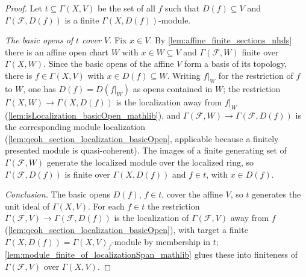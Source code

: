\begin{proof}\leanok
  Let \(t \subseteq \Gamma(X, V)\) be the set of all \(f\) such that
  \(D(f) \subseteq V\) and \(\Gamma(\mathcal{F}, D(f))\) is a finite
  \(\Gamma(X, D(f))\)-module.

  \emph{The basic opens of \(t\) cover \(V\).}  Fix \(x \in V\).  By
  \cref{lem:affine_finite_sections_nhds} there is an affine open chart \(W\)
  with \(x \in W \subseteq V\) and \(\Gamma(\mathcal{F}, W)\) finite over
  \(\Gamma(X, W)\).  Since the basic opens of the affine \(V\) form a basis of
  its topology, there is \(f \in \Gamma(X, V)\) with
  \(x \in D(f) \subseteq W\).  Writing \(f|_W\) for the restriction of \(f\)
  to \(W\), one has \(D(f) = D(f|_W)\) as opens contained in \(W\); the
  restriction \(\Gamma(X, W) \to \Gamma(X, D(f))\) is the localization away
  from \(f|_W\) (\cref{lem:isLocalization_basicOpen_mathlib}), and
  \(\Gamma(\mathcal{F}, W) \to \Gamma(\mathcal{F}, D(f))\) is the
  corresponding module localization
  (\cref{lem:qcoh_section_localization_basicOpen}, applicable because a
  finitely presented module is quasi-coherent).  The images of a finite
  generating set of \(\Gamma(\mathcal{F}, W)\) generate the localized module
  over the localized ring, so \(\Gamma(\mathcal{F}, D(f))\) is finite over
  \(\Gamma(X, D(f))\) and \(f \in t\), with \(x \in D(f)\).

  \emph{Conclusion.}  The basic opens \(D(f)\), \(f \in t\), cover the affine
  \(V\), so \(t\) generates the unit ideal of \(\Gamma(X, V)\).  For each
  \(f \in t\) the restriction
  \(\Gamma(\mathcal{F}, V) \to \Gamma(\mathcal{F}, D(f))\) is the localization
  of \(\Gamma(\mathcal{F}, V)\) away from \(f\)
  (\cref{lem:qcoh_section_localization_basicOpen}), with target a finite
  \(\Gamma(X, D(f)) = \Gamma(X, V)_f\)-module by membership in \(t\);
  \cref{lem:module_finite_of_localizationSpan_mathlib} glues these into
  finiteness of \(\Gamma(\mathcal{F}, V)\) over \(\Gamma(X, V)\).
\end{proof}


